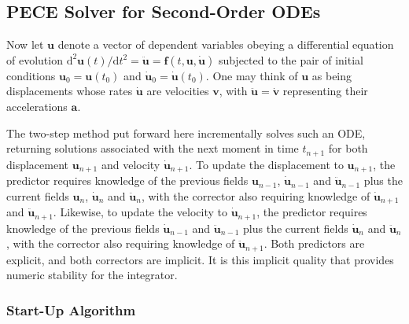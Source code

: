 \subsection{PECE Solver for Second-Order ODEs}
\label{sec:2ndOrderPECE}

Now let $\mathbf{u}$ denote a vector of dependent variables obeying a differential equation of evolution $\mathrm{d}^2 \mathbf{u}(t) / \mathrm{d} t^2 = \ddot{\mathbf{u}} = \mathbf{f} (t, \mathbf{u}, \dot{\mathbf{u}})$ subjected to the pair of initial conditions $\mathbf{u}_0 = \mathbf{u}(t_0)$ and $\dot{\mathbf{u}}_0 = \dot{\mathbf{u}}(t_0)$.  One may think of $\mathbf{u}$ as being displacements whose rates $\dot{\mathbf{u}}$ are velocities $\mathbf{v}$, with $\ddot{\mathbf{u}} = \dot{\mathbf{v}}$ representing their accelerations $\mathbf{a}$. 

The two-step method put forward here incrementally solves such an ODE, returning solutions associated with the next moment in time $t_{n+1}$ for both displacement $\mathbf{u}_{n+1}$ and velocity $\dot{\mathbf{u}}_{n+1}$.  To update the displacement to $\mathbf{u}_{n+1}$, the predictor requires knowledge of the previous fields $\mathbf{u}_{n-1}$, $\dot{\mathbf{u}}_{n-1}$ and $\ddot{\mathbf{u}}_{n-1}$ plus the current fields $\mathbf{u}_n$, $\dot{\mathbf{u}}_n$ and $\ddot{\mathbf{u}}_n$, with the corrector also requiring knowledge of $\dot{\mathbf{u}}_{n+1}$ and $\ddot{\mathbf{u}}_{n+1}$.  Likewise, to update the velocity to $\dot{\mathbf{u}}_{n+1}$, the predictor requires knowledge of the previous fields $\dot{\mathbf{u}}_{n-1}$ and $\ddot{\mathbf{u}}_{n-1}$ plus the current fields $\dot{\mathbf{u}}_n$ and $\ddot{\mathbf{u}}_n$, with the corrector also requiring knowledge of $\ddot{\mathbf{u}}_{n+1}$.  Both predictors are explicit, and both correctors are implicit.  It is this implicit quality that provides numeric stability for the integrator.

\subsubsection{Start-Up Algorithm}

